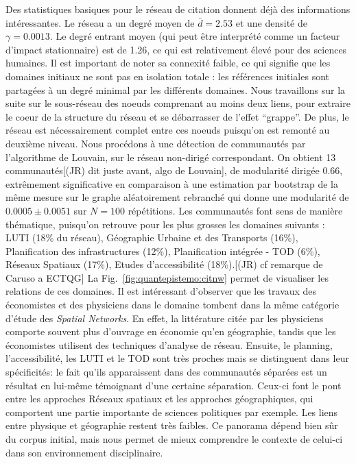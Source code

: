 Des statistiques basiques pour le réseau de citation donnent déjà des informations intéressantes. Le réseau a un degré moyen de $\bar{d}=2.53$ et une densité de $\gamma=0.0013$. Le degré entrant moyen (qui peut être interprété comme un facteur d'impact stationnaire) est de 1.26, ce qui est relativement élevé pour des sciences humaines. Il est important de noter sa connexité faible, ce qui signifie que les domaines initiaux ne sont pas en isolation totale : les références initiales sont partagées à un degré minimal par les différents domaines. Nous travaillons sur la suite sur le sous-réseau des noeuds comprenant au moins deux liens, pour extraire le coeur de la structure du réseau et se débarrasser de l'effet ``grappe''. De plus, le réseau est nécessairement complet entre ces noeuds puisqu'on est remonté au deuxième niveau. Nous procédons à une détection de communautés par l'algorithme de Louvain, sur le réseau non-dirigé correspondant. On obtient 13 communautés[(JR) dit juste avant, algo de Louvain], de modularité dirigée 0.66, extrêmement significative en comparaison à une estimation par bootstrap de la même mesure sur le graphe aléatoirement rebranché qui donne une modularité de $0.0005 \pm 0.0051$ sur $N=100$ répétitions. Les communautés font sens de manière thématique, puisqu'on retrouve pour les plus grosses les domaines suivants : LUTI (18\% du réseau), Géographie Urbaine et des Transports (16\%), Planification des infrastructures (12\%), Planification intégrée - TOD (6\%), Réseaux Spatiaux (17\%), Etudes d'accessibilité (18\%).[(JR) cf remarque de Caruso a ECTQG] La Fig.~\ref{fig:quantepistemo:citnw} permet de visualiser les relations de ces domaines. Il est intéressant d'observer que les travaux des économistes et des physiciens dans le domaine tombent dans la même catégorie d'étude des \emph{Spatial Networks}. En effet, la littérature citée par les physiciens comporte souvent plus d'ouvrage en économie qu'en géographie, tandis que les économistes utilisent des techniques d'analyse de réseau. Ensuite, le planning, l'accessibilité, les LUTI et le TOD sont très proches mais se distinguent dans leur spécificités: le fait qu'ils apparaissent dans des communautés séparées est un résultat en lui-même témoignant d'une certaine séparation. Ceux-ci font le pont entre les approches Réseaux spatiaux et les approches géographiques, qui comportent une partie importante de sciences politiques par exemple. Les liens entre physique et géographie restent très faibles. Ce panorama dépend bien sûr du corpus initial, mais nous permet de mieux comprendre le contexte de celui-ci dans son environnement disciplinaire.



